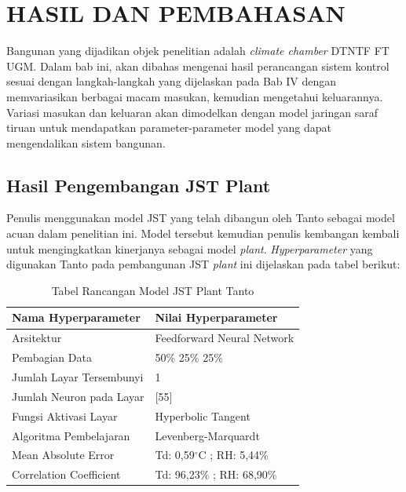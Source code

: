 \chapter{HASIL DAN PEMBAHASAN}
\label{hasil-dan-pembahasan}
Bangunan yang dijadikan objek penelitian adalah \textit{climate chamber} DTNTF FT UGM. Dalam bab ini, akan dibahas mengenai hasil perancangan sistem kontrol sesuai dengan langkah-langkah yang dijelaskan pada Bab IV dengan memvariasikan berbagai macam masukan, kemudian mengetahui keluarannya. Variasi masukan dan keluaran akan dimodelkan dengan model jaringan saraf tiruan untuk mendapatkan parameter-parameter model yang dapat mengendalikan sistem bangunan.\\

\section{Hasil Pengembangan JST Plant}

Penulis menggunakan model JST yang telah dibangun oleh Tanto\cite{skripsiTanto} sebagai model acuan dalam penelitian ini. Model tersebut kemudian penulis kembangan kembali untuk mengingkatkan kinerjanya sebagai model \textit{plant}. \textit{Hyperparameter} yang digunakan Tanto pada pembangunan JST \textit{plant }ini dijelaskan pada tabel berikut:\\

\begin{table}[!h]
	\caption{Tabel Rancangan Model JST Plant Tanto}
	\label{tbl:5:NNPlantTanto}
	\centering
	\begin{tabular}{|p{5.7cm}|p{5cm}|}
		\hline
		\textbf{Nama Hyperparameter} & \textbf{Nilai Hyperparameter} \\ \hline
		Arsitektur & Feedforward Neural Network \\ \hline
		Pembagian Data & 50\% 25\% 25\% \\ \hline 
		Jumlah Layar Tersembunyi & 1 \\ \hline
		Jumlah Neuron pada Layar & [55] \\ \hline
		Fungsi Aktivasi Layar & Hyperbolic Tangent \\ \hline
		Algoritma Pembelajaran & Levenberg-Marquardt \\ \hline
		Mean Absolute Error & Td: 0,59$^\circ$C ; RH: 5,44\% \\ \hline
		Correlation Coefficient & Td: 96,23\% ; RH: 68,90\% \\ \hline
	\end{tabular}
\end{table}
\vspace{2em}

